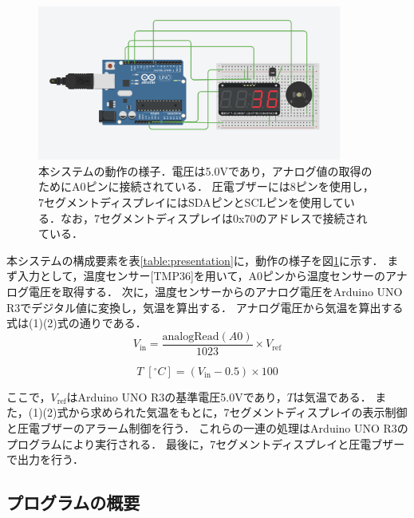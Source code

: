 \documentclass[uplatex,dvipdfmx]{jsarticle}
\begin{document}
\begin{figure}[H]
\centering
\includegraphics[width=10cm]{./Figs/dousa.png}
\caption{本システムの動作の様子．電圧は5.0Vであり，アナログ値の取得のためにA0ピンに接続されている．
圧電ブザーには8ピンを使用し，7セグメントディスプレイにはSDAピンとSCLピンを使用している．なお，7セグメントディスプレイは0x70のアドレスで接続されている．}
\label{fig:problem}
\end{figure}


\indent
本システムの構成要素を表\ref{table:presentation}に，動作の様子を図\ref{fig:problem}に示す．
まず入力として，温度センサー[TMP36]を用いて，A0ピンから温度センサーのアナログ電圧を取得する．
次に，温度センサーからのアナログ電圧をArduino UNO R3でデジタル値に変換し，気温を算出する．
アナログ電圧から気温を算出する式は(1)(2)式の通りである．
\begin{equation}
V_{\text{in}} = \frac{\text{analogRead}(A0)}{1023} \times V_{\text{ref}}
\end{equation}

\begin{equation}
T\;[^{\circ}C] = (V_{\text{in}} - 0.5) \times 100
\end{equation}

\indent
ここで，$V_{\text{ref}}$はArduino UNO R3の基準電圧5.0Vであり，$T$は気温である．
また，(1)(2)式から求められた気温をもとに，7セグメントディスプレイの表示制御と圧電ブザーのアラーム制御を行う．
これらの一連の処理はArduino UNO R3のプログラムにより実行される．
最後に，7セグメントディスプレイと圧電ブザーで出力を行う．

\subsection{プログラムの概要}
\end{document}
